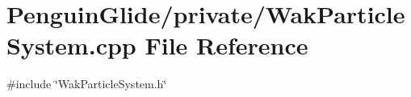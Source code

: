 \section{Penguin\+Glide/private/\+Wak\+Particle\+System.cpp File Reference}
\label{_wak_particle_system_8cpp}
{\ttfamily \#include \char`\"{}Wak\+Particle\+System.\+h\char`\"{}}\newline
